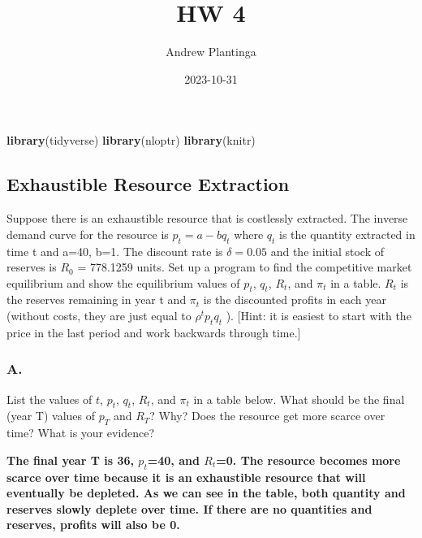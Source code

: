\documentclass[
]{article}
\title{HW 4}
\author{Andrew Plantinga}
\date{2023-10-31}
\newenvironment{Shaded}{\begin{snugshade}}{\end{snugshade}}
\newcommand{\FunctionTok}[1]{\textcolor[rgb]{0.13,0.29,0.53}{\textbf{#1}}}
\newcommand{\NormalTok}[1]{#1}
\begin{document}
\maketitle

\begin{Shaded}
\begin{Highlighting}[]
\FunctionTok{library}\NormalTok{(tidyverse)}
\FunctionTok{library}\NormalTok{(nloptr)}
\FunctionTok{library}\NormalTok{(knitr)}
\end{Highlighting}
\end{Shaded}

\hypertarget{exhaustible-resource-extraction}{%
\subsection{Exhaustible Resource
Extraction}\label{exhaustible-resource-extraction}}

Suppose there is an exhaustible resource that is costlessly extracted.
The inverse demand curve for the resource is \(p_t=a-bq_t\) where
\(q_t\) is the quantity extracted in time t and a=40, b=1. The discount
rate is \(\delta=0.05\) and the initial stock of reserves is \(R_0\) =
778.1259 units. Set up a program to find the competitive market
equilibrium and show the equilibrium values of \(p_t\), \(q_t\),
\(R_t\), and \(\pi_t\) in a table. \(R_t\) is the reserves remaining in
year t and \(\pi_t\) is the discounted profits in each year (without
costs, they are just equal to \(\rho^tp_tq_t\) ). {[}Hint: it is easiest
to start with the price in the last period and work backwards through
time.{]}

\hypertarget{a.}{%
\subsubsection{A.}\label{a.}}

List the values of \(t\), \(p_t\), \(q_t\), \(R_t\), and \(\pi_t\) in a
table below. What should be the final (year T) values of \(p_T\) and
\(R_T\)? Why? Does the resource get more scarce over time? What is your
evidence?

{\textbf{The final year T is 36, \(p_t\)=40, and \(R_t\)=0. The resource
becomes more scarce over time because it is an exhaustible resource that
will eventually be depleted. As we can see in the table, both quantity
and reserves slowly deplete over time. If there are no quantities and
reserves, profits will also be 0. }}
\end{document}
